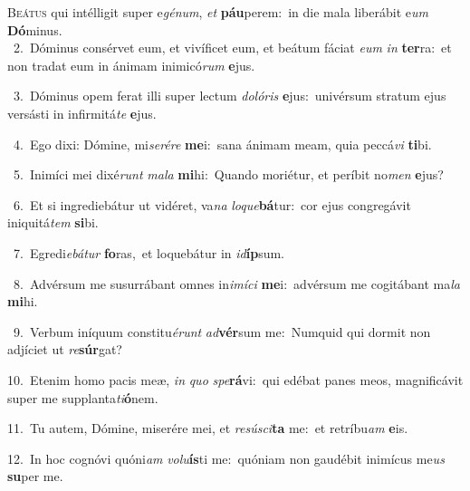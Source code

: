 \lettrine{\initial\textcolor{\initialcolor}{B}}{eátus} qui intélligit super e\-\textit{gé}\-\textit{num}, \textit{et} \textbf{páu}\-perem:~\star in die mala liberábit e\textit{um} \textbf{Dó}\-minus.\\
{\numbfont\textcolor{\numbcolor}{~2.}}~Dóminus consérvet eum, et vivíficet eum, et beátum fáciat \textit{e}\-\textit{um} \textit{in} \textbf{ter}\-ra:~\star et non tradat eum in ánimam inimicó\textit{rum} \textbf{e}\-jus.\par
{\numbfont\textcolor{\numbcolor}{~3.}}~Dóminus opem ferat illi super lectum \textit{do}\-\textit{ló}\textit{ris} \textbf{e}\-jus:~\star univérsum stratum ejus versásti in infirmitá\textit{te} \textbf{e}\-jus.\par
{\numbfont\textcolor{\numbcolor}{~4.}}~Ego dixi: Dómine, mi\-\textit{se}\-\textit{ré}\textit{re} \textbf{me}\-i:~\star sana ánimam meam, quia peccá\textit{vi} \textbf{ti}\-bi.\par
{\numbfont\textcolor{\numbcolor}{~5.}}~Inimíci mei dixé\textit{runt} \textit{ma}\-\textit{la} \textbf{mi}\-hi:~\star Quando moriétur, et períbit no\textit{men} \textbf{e}\-jus?\par
{\numbfont\textcolor{\numbcolor}{~6.}}~Et si ingrediebátur ut vidéret, va\textit{na} \textit{lo}\-\textit{que}\textbf{bá}tur:~\star cor ejus congregávit iniquitá\textit{tem} \textbf{si}\-bi.\par
{\numbfont\textcolor{\numbcolor}{~7.}}~Egredi\-\textit{e}\-\textit{bá}\textit{tur} \textbf{fo}\-ras,~\star et loquebátur in \textit{id}\-\textbf{íp}sum.\par
{\numbfont\textcolor{\numbcolor}{~8.}}~Advérsum me susurrábant omnes in\-\textit{i}\-\textit{mí}\textit{ci} \textbf{me}\-i:~\star advérsum me cogitábant ma\textit{la} \textbf{mi}\-hi.\par
{\numbfont\textcolor{\numbcolor}{~9.}}~Verbum iníquum constitu\-\textit{é}\-\textit{runt} \textit{ad}\-\textbf{vér}sum me:~\star Numquid qui dormit non adjíciet ut \textit{re}\-\textbf{súr}gat?\par
{\numbfont\textcolor{\numbcolor}{10.}}~Etenim homo pacis meæ, \textit{in} \textit{quo} \textit{spe}\-\textbf{rá}vi:~\star qui edébat panes meos, magnificávit super me supplanta\-\textit{ti}\-\textbf{ó}nem.\par
{\numbfont\textcolor{\numbcolor}{11.}}~Tu autem, Dómine, miserére mei, et \textit{re}\-\textit{sú}\textit{sci}\textbf{ta} me:~\star et retríbu\textit{am} \textbf{e}\-is.\par
{\numbfont\textcolor{\numbcolor}{12.}}~In hoc cognóvi quóni\textit{am} \textit{vo}\-\textit{lu}\textbf{ís}ti me:~\star quóniam non gaudébit inimícus me\textit{us} \textbf{su}\-per me.\par
